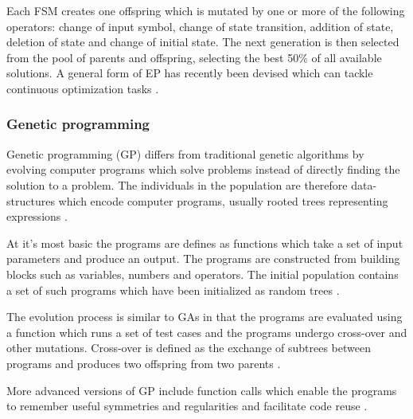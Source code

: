 Each FSM creates one offspring which is mutated by one or more of the following operators: change of input symbol, change of state transition, addition of state, deletion of state and change of initial state. The next generation is then selected from the pool of parents and offspring, selecting the best 50\% of all available solutions. A general form of EP has recently been devised which can tackle continuous optimization tasks \cite{Michalewicz1997}.

\subsubsection{Genetic programming}

Genetic programming (GP) differs from traditional genetic algorithms by evolving computer programs which solve problems instead of directly finding the solution to a problem. The individuals in the population are therefore data-structures which encode computer programs, usually rooted trees representing expressions \cite{Michalewicz1997}.

At it's most basic the programs are defines as functions which take a set of input parameters and produce an output. The programs are constructed from building blocks such as variables, numbers and operators. The initial population contains a set of such programs which have been initialized as random trees \cite{Michalewicz1997}.

The evolution process is similar to GAs in that the programs are evaluated using a function which runs a set of test cases and the programs undergo cross-over and other mutations. Cross-over is defined as the exchange of subtrees between programs and produces two offspring from two parents \cite{Michalewicz1997}.

More advanced versions of GP include function calls which enable the programs to remember useful symmetries and regularities and facilitate code reuse \cite{Michalewicz1997}.
